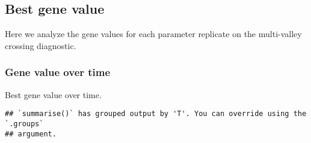 \documentclass[]{book}
\newenvironment{Shaded}{\begin{snugshade}}{\end{snugshade}}
\newcommand{\DataTypeTok}[1]{\textcolor[rgb]{0.13,0.29,0.53}{#1}}
\newcommand{\KeywordTok}[1]{\textcolor[rgb]{0.13,0.29,0.53}{\textbf{#1}}}
\newcommand{\NormalTok}[1]{#1}
\newcommand{\OperatorTok}[1]{\textcolor[rgb]{0.81,0.36,0.00}{\textbf{#1}}}
\newcommand{\StringTok}[1]{\textcolor[rgb]{0.31,0.60,0.02}{#1}}
\begin{document}
\hypertarget{best-gene-value-2}{%
\subsection{Best gene value}\label{best-gene-value-2}}

Here we analyze the gene values for each parameter replicate on the multi-valley crossing diagnostic.

\hypertarget{gene-value-over-time-1}{%
\subsubsection{Gene value over time}\label{gene-value-over-time-1}}

Best gene value over time.

\begin{Shaded}
\end{Shaded}

\begin{verbatim}
## `summarise()` has grouped output by 'T'. You can override using the `.groups`
## argument.
\end{verbatim}
\end{document}
